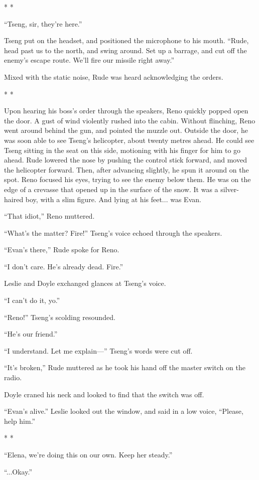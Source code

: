\documentclass[oneside]{book}
\begin{document}
* *

“Tseng, sir, they’re here.”

Tseng put on the headset, and positioned the microphone to his mouth. “Rude, head past us to the north, and swing around. Set up a barrage, and cut off the enemy’s escape route. We’ll fire our missile right away.”

Mixed with the static noise, Rude was heard acknowledging the orders.

* *

Upon hearing his boss’s order through the speakers, Reno quickly popped open the door. A gust of wind violently rushed into the cabin. Without flinching, Reno went around behind the gun, and pointed the muzzle out. Outside the door, he was soon able to see Tseng’s helicopter, about twenty metres ahead. He could see Tseng sitting in the seat on this side, motioning with his finger for him to go ahead. Rude lowered the nose by pushing the control stick forward, and moved the helicopter forward. Then, after advancing slightly, he spun it around on the spot. Reno focused his eyes, trying to see the enemy below them. He was on the edge of a crevasse that opened up in the surface of the snow. It was a silver-haired boy, with a slim figure. And lying at his feet... was Evan.

“That idiot,” Reno muttered.

“What’s the matter? Fire!” Tseng’s voice echoed through the speakers.

“Evan’s there,” Rude spoke for Reno.

“I don’t care. He’s already dead. Fire.”

Leslie and Doyle exchanged glances at Tseng’s voice.

“I can’t do it, yo.”

“Reno!” Tseng’s scolding resounded.

“He’s our friend.”

“I understand. Let me explain—” Tseng’s words were cut off.

“It’s broken,” Rude muttered as he took his hand off the master switch on the radio.

Doyle craned his neck and looked to find that the switch was off.

“Evan’s alive.” Leslie looked out the window, and said in a low voice, “Please, help him.”

* *

“Elena, we’re doing this on our own. Keep her steady.”

“...Okay.”
\end{document}
